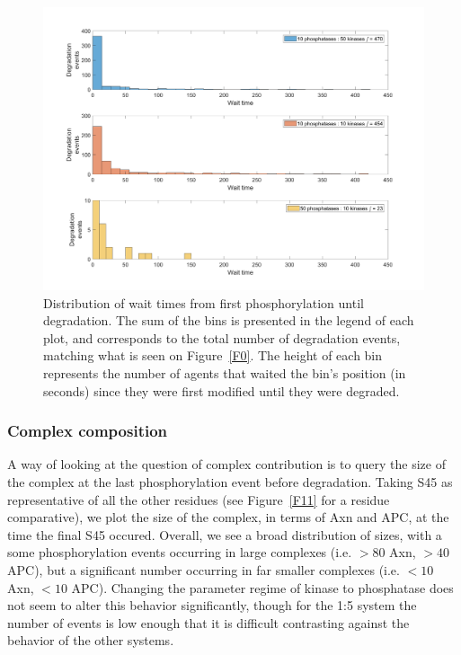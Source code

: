 \begin{figure}[h]
  \centering
  \includegraphics[width=\columnwidth]{wnt/F2_wait_times.png}
  \caption{Distribution of wait times from first phosphorylation until
    degradation. The sum of the bins is presented in the legend of each
    plot, and corresponds to the total number of degradation events, matching
		what is seen on Figure~\ref{F0}. The height of each bin represents the
		number of agents that waited the bin's position (in seconds)
		since they were first modified until they were degraded.}
  \label{F2}
\end{figure}


\subsubsection*{Complex composition}

A way of looking at the question of complex contribution
is to query the size of the complex at the last phosphorylation event
before degradation. Taking S45 as representative of all the other
residues (see Figure~\ref{F11} for a residue comparative), we plot the
size of the complex, in terms of Axn and APC, at the time the final S45 occured.
Overall, we see a broad distribution of sizes, with a some phosphorylation
events occurring in large complexes (i.e. $>80$ Axn, $>40$ APC), but
a significant number occurring in far smaller complexes (i.e. $<10$
Axn, $<10$ APC). Changing the parameter regime of kinase to phosphatase
does not seem to alter this behavior significantly, though for the 1:5
system the number of events is low enough that it is difficult
contrasting against the behavior of the other systems.

